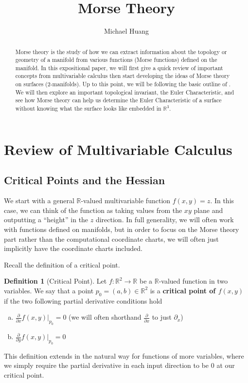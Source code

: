 \documentclass[12pt]{article}
\title{Morse Theory}
\author{Michael Huang}
\date{}
\newcommand{\bR}{{\mathbb R}}
\theoremstyle{definition}
\newtheorem{definition}{Definition}
\begin{document}
\graphicspath{ {images/} }
	
\maketitle

\begin{abstract}
	Morse theory is the study of how we can extract information about the topology or geometry of a manifold from various functions (Morse functions) defined on the manifold. In this expositional paper, we will first give a quick review of important concepts from multivariable calculus then start developing the ideas of Morse theory on surfaces (2-manifolds). Up to this point, we will be following the basic outline of \cite{Matsumoto13}. We will then explore an important topological invariant, the Euler Characteristic, and see how Morse theory can help us determine the Euler Characteristic of a surface without knowing what the surface looks like embedded in $\bR^3$. 
\end{abstract}

\section{Review of Multivariable Calculus}

\subsection{Critical Points and the Hessian}
We start with a general $\bR$-valued multivariable function $f(x,y)=z$. In this case, we can think of the function as taking values from the $xy$ plane and outputting a ``height'' in the $z$ direction. In full generality, we will often work with functions defined on manifolds, but in order to focus on the Morse theory part rather than the computational coordinate charts, we will often just implicitly have the coordinate charts included. 

Recall the definition of a critical point. 

\begin{definition}[Critical Point]
	Let $f:\bR^2\rightarrow \bR$ be a $\bR$-valued function in two variables. We say that a point $p_0= (a,b)\in \bR^2$ is a \textbf{critical point of $f(x,y)$} if the two following partial derivative conditions hold
	\begin{enumerate}[(a)]
		\item $\frac{\partial}{\partial x}f(x,y)|_{p_0} = 0$ (we will often shorthand $\frac{\partial}{\partial x}$ to just $\partial_x$)
		\item $\frac{\partial}{\partial y}f(x,y)|_{p_0} = 0$
	\end{enumerate}
	This definition extends in the natural way for functions of more variables, where we simply require the partial derivative in each input direction to be 0 at our critical point. 
\end{definition}
\end{document}
